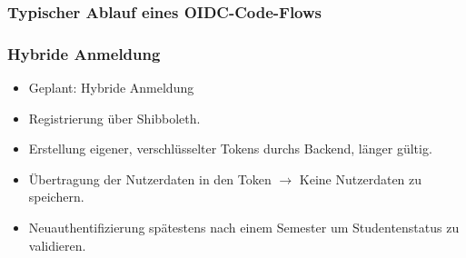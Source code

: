 \begin{frame}\frametitle{Typischer Ablauf eines OIDC-Code-Flows}
    \centering
    \captionsetup[figure]{labelformat=empty}
    \captionsetup[figure]{labelformat=default}
\end{frame}

\begin{frame}\frametitle{Hybride Anmeldung}
    \begin{itemize}
        \item Geplant: Hybride Anmeldung
        \item Registrierung über Shibboleth.
        \item Erstellung eigener, verschlüsselter Tokens durchs Backend, länger gültig.
        \item Übertragung der Nutzerdaten in den Token $\rightarrow$ Keine Nutzerdaten zu speichern.
        \item Neuauthentifizierung spätestens nach einem Semester um Studentenstatus zu validieren.
    \end{itemize}
\end{frame}
